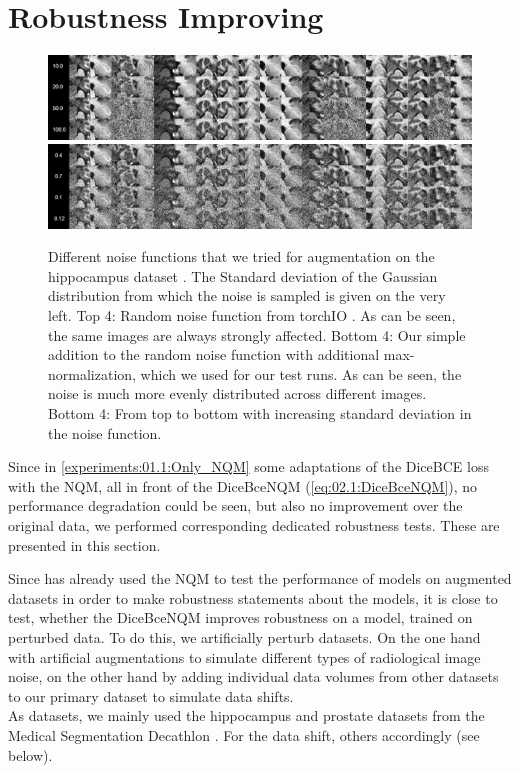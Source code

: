 \section{Robustness Improving}
\label{experiments:03.0:Intro}
\begin{figure}[h!]
    \centering
    \includegraphics[width=\linewidth]{Graphics/datasets/datasets_hippo_randNoise_v2.png}\\
    \vspace{5pt}
    \includegraphics[width=\linewidth]{Graphics/datasets/datasets_hippo_normNoise_v2.png}
    \caption{Different noise functions that we tried for augmentation on the hippocampus dataset \cite{Antonelli:2022:MedSegmentationDecatlon}. The Standard deviation of the Gaussian distribution from which the noise is sampled is given on the very left. Top 4: Random noise function from torchIO \cite{torchIO}. As can be seen, the same images are always strongly affected. Bottom 4: Our simple addition to the random noise function with additional max-normalization, which we used for our test runs. As can be seen, the noise is much more evenly distributed across different images. Bottom 4: From top to bottom with increasing standard deviation in the noise function.}
    \label{fig:augemented:datasets:noise_problem}
\end{figure}

Since in \autoref{experiments:01.1:Only_NQM} some adaptations of the DiceBCE loss with the NQM, all in front of the DiceBceNQM (\autoref{eq:02.1:DiceBceNQM}), no performance degradation could be seen, but also no improvement over the original data, we performed corresponding dedicated robustness tests. These are presented in this section.

Since \cite{kalkhof:2023:M3D-NCA} has already used the NQM to test the performance of models on augmented datasets in order to make robustness statements about the models, it is close to test, whether the DiceBceNQM improves robustness on a model, trained on perturbed data. To do this, we artificially perturb datasets. On the one hand with artificial augmentations to simulate different types of radiological image noise, on the other hand by adding individual data volumes from other datasets to our primary dataset to simulate data shifts.\\
As datasets, we mainly used the hippocampus and prostate datasets from the Medical Segmentation Decathlon \cite{Antonelli:2022:MedSegmentationDecatlon}. For the data shift, others accordingly (see below).

